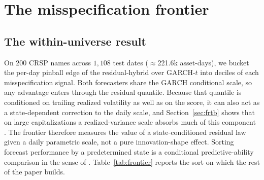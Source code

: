 \documentclass[11pt]{article}
\theoremstyle{remark}
\begin{document}
\section{The misspecification frontier}\label{sec:frontier}

\subsection{The within-universe result}

On 200 CRSP names across $1{,}108$ test dates ($\approx$221.6k asset-days), we bucket the per-day
pinball edge of the residual-hybrid over GARCH-$t$ into
deciles of each misspecification signal. Both forecasters share the GARCH conditional scale, so any advantage enters through the residual quantile. Because that quantile is conditioned on trailing realized volatility as well as on the score, it can also act as a state-dependent correction to the daily scale, and Section~\ref{sec:frtb} shows that on large capitalizations a realized-variance scale absorbs much of this component \citep{andersenbollerslev1998, hansenlunde2005}. The frontier therefore measures the value of a state-conditioned residual law given a daily parametric scale, not a pure innovation-shape effect. Sorting
forecast performance by a predetermined state is a conditional
predictive-ability comparison in the sense of \citet{giacominiwhite2006}.
Table~\ref{tab:frontier} reports the sort on which the rest of the paper builds.
\end{document}
